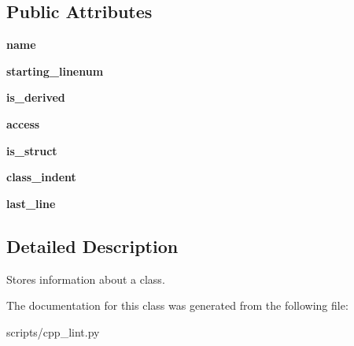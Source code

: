 \subsection*{Public Attributes}
\begin{DoxyCompactItemize}
\item 
\mbox{\label{classcpp__lint_1_1___class_info_afb6a10e0d51615e98e0606d0e15210e7}} 
{\bfseries name}
\item 
\mbox{\label{classcpp__lint_1_1___class_info_afe712dbb6c3f4d149bec65cf4b68d9df}} 
{\bfseries starting\+\_\+linenum}
\item 
\mbox{\label{classcpp__lint_1_1___class_info_a508ec13390cdbf9dfe60f0efb38b5427}} 
{\bfseries is\+\_\+derived}
\item 
\mbox{\label{classcpp__lint_1_1___class_info_ad332b2012a0513f1f0f6d03f78b5ee6a}} 
{\bfseries access}
\item 
\mbox{\label{classcpp__lint_1_1___class_info_a7e3bd78fc8ae6bb16179fc0d0c4c6e8f}} 
{\bfseries is\+\_\+struct}
\item 
\mbox{\label{classcpp__lint_1_1___class_info_a54739a914a760d8eb0b7aed9e1ef04c2}} 
{\bfseries class\+\_\+indent}
\item 
\mbox{\label{classcpp__lint_1_1___class_info_a5bb303746c95a704864286dcae21de31}} 
{\bfseries last\+\_\+line}
\end{DoxyCompactItemize}


\subsection{Detailed Description}
\begin{DoxyVerb}Stores information about a class.\end{DoxyVerb}
 

The documentation for this class was generated from the following file\+:\begin{DoxyCompactItemize}
\item 
scripts/cpp\+\_\+lint.\+py\end{DoxyCompactItemize}
